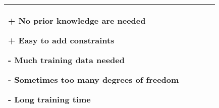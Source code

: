 \begin{landscape}
\begin{tabular}{| p{3cm} |  p{3.5cm} | p{5cm} | p{4cm} | p{8cm} |}
	\begin{beschreibListe}
	\item[+] No prior knowledge are needed
	\item[+] Easy to add constraints
	\item[-] Much training data needed
	\item[-] Sometimes too many degrees of freedom
	\item[-] Long training time
	\end{beschreibListe}\\
\hline

	
\end{tabular}

\end{landscape}